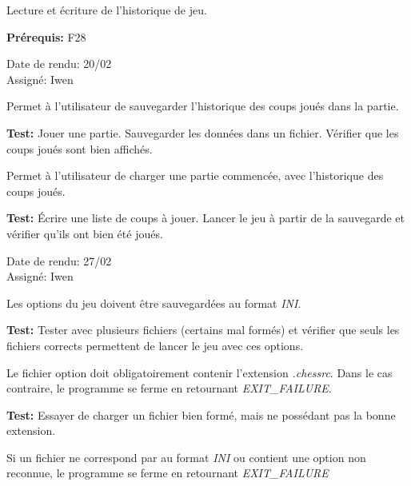 \documentclass{article}
\begin{document}
\begin{nonfunctionnalneedbox}
    Lecture et écriture de l'historique de jeu.

    \textbf{Prérequis:} F28
    \begin{duedatebox}
        Date de rendu: 20/02\\
        Assigné: Iwen
    \end{duedatebox}
    \begin{subneedbox}
        Permet à l'utilisateur de sauvegarder l'historique des coups joués dans la partie.

        \textbf{Test:} Jouer une partie. Sauvegarder les données dans un fichier. Vérifier
        que les coups joués sont bien affichés.
    \end{subneedbox}
    \begin{subneedbox}
        Permet à l'utilisateur de charger une partie commencée, avec l'historique des coups joués.

        \textbf{Test:} Écrire une liste de coups à jouer. Lancer le jeu à partir de la sauvegarde et
        vérifier qu'ils ont bien été joués.
    \end{subneedbox}
\end{nonfunctionnalneedbox}

\begin{nonfunctionnalneedbox}
    \begin{duedatebox}
        Date de rendu: 27/02\\
        Assigné: Iwen
    \end{duedatebox}
    \begin{subneedbox}
        Les options du jeu doivent être sauvegardées au format \textit{INI}.

        \textbf{Test:} Tester avec plusieurs fichiers (certains mal formés) et vérifier 
        que seuls les fichiers corrects permettent de lancer le jeu avec ces options.
    \end{subneedbox}
    \begin{subneedbox}
        Le fichier option doit obligatoirement contenir l'extension \textit{.chessrc}.
        Dans le cas contraire, le programme se ferme en retournant \textit{EXIT\_FAILURE}.

        \textbf{Test:} Essayer de charger un fichier bien formé, mais ne possédant
        pas la bonne extension.
    \end{subneedbox}
    \begin{subneedbox}
        Si un fichier ne correspond par au format \textit{INI} ou contient une 
        option non reconnue, le programme se ferme en retournant \textit{EXIT\_FAILURE}
    \end{subneedbox}
    
\end{nonfunctionnalneedbox}
\end{document}
